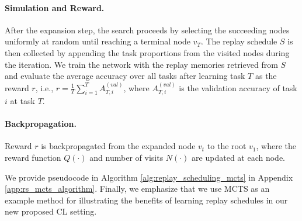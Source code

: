 \paragraph{Simulation and Reward.} After the expansion step, the search proceeds by selecting the succeeding nodes uniformly at random until reaching a terminal node $v_T$. %
The replay schedule $S$ is then collected by appending the task proportions from the visited nodes during the iteration. We train the network with the replay memories retrieved from $S$ and evaluate the average accuracy over all tasks after learning task $T$ as the reward $r$, i.e., $r = \frac{1}{T} \sum_{i=1}^T A_{T, i}^{(val)}$, where $A_{T, i}^{(val)}$ is the validation accuracy of task $i$ at task $T$. %


\vspace{-3mm}
\paragraph{Backpropagation.} Reward $r$ is backpropagated from the expanded node $v_t$ %
to the root $v_1$, %
where the reward function $Q(\cdot)$ and number of visits $N(\cdot)$ are updated at each node.  %

\vspace{-1mm}
We provide pseudocode in Algorithm \ref{alg:replay_scheduling_mcts} in Appendix \ref{app:rs_mcts_algorithm}. 
Finally, we emphasize that we use MCTS as an example method for illustrating the benefits of learning replay schedules in our new proposed CL setting.  %



